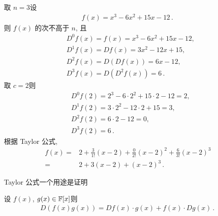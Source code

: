 \begin{example}
    取 $n = 3$\period 设
    \begin{align*}
        f(x) = x^3 - 6x^2 + 15x - 12 \period
    \end{align*}
    则 $f(x)$ 的次不高于 $n$, 且
    \begin{align*}
         & D^0 f(x) = f(x) = x^3 - 6x^2 + 15x - 12, \\
         & D^1 f(x) = D f(x) = 3x^2 - 12x + 15,     \\
         & D^2 f(x) = D (D f(x)) = 6x - 12,         \\
         & D^3 f(x) = D (D^2 f(x)) = 6 \period
    \end{align*}
    取 $c = 2$\period 则
    \begin{align*}
         & D^0 f(2) = 2^3 - 6 \cdot 2^2 + 15 \cdot 2 - 12 = 2, \\
         & D^1 f(2) = 3 \cdot 2^2 - 12 \cdot 2 + 15 = 3,       \\
         & D^2 f(2) = 6 \cdot 2 - 12 = 0,                      \\
         & D^3 f(2) = 6 \period
    \end{align*}
    根据 Taylor 公式,
    \begin{align*}
        f(x)
        = {} & 2 + \frac{3}{1!} (x-2) + \frac{0}{2!} (x-2)^2 + \frac{6}{3!} (x-2)^3 \\
        = {} & 2 + 3(x-2) + (x-2)^3 \period
    \end{align*}
\end{example}

Taylor 公式一个用途是证明

\begin{proposition}
    设 $f(x)$, $g(x) \in \mathbb{F}[x]$\period 则
    \begin{align*}
        D(f(x) g(x)) = Df(x) \cdot g(x) + f(x) \cdot Dg(x) \period \tag*{(\myStar)}
    \end{align*}
\end{proposition}

